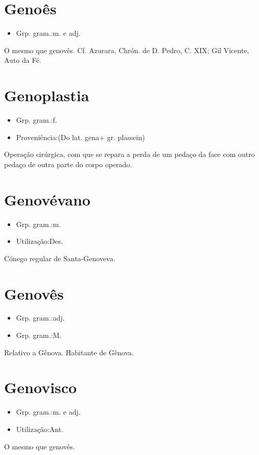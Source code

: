 \section{Genoês}
\begin{itemize}
\item {Grp. gram.:m.  e  adj.}
\end{itemize}
O mesmo que \textunderscore genovês\textunderscore . Cf. Azurara, \textunderscore Chrón. de D. Pedro\textunderscore , C. XIX; Gil Vicente, \textunderscore Auto da Fé\textunderscore .
\section{Genoplastia}
\begin{itemize}
\item {Grp. gram.:f.}
\end{itemize}
\begin{itemize}
\item {Proveniência:(Do lat. \textunderscore gena\textunderscore  + gr. \textunderscore plassein\textunderscore )}
\end{itemize}
Operação cirúrgica, com que se repara a perda de um pedaço da face com outro pedaço de outra parte do corpo operado.
\section{Genovévano}
\begin{itemize}
\item {Grp. gram.:m.}
\end{itemize}
\begin{itemize}
\item {Utilização:Des.}
\end{itemize}
Cónego regular de Santa-Genoveva.
\section{Genovês}
\begin{itemize}
\item {Grp. gram.:adj.}
\end{itemize}
\begin{itemize}
\item {Grp. gram.:M.}
\end{itemize}
Relativo a Gênova.
Habitante de Gênova.
\section{Genovisco}
\begin{itemize}
\item {Grp. gram.:m.  e  adj.}
\end{itemize}
\begin{itemize}
\item {Utilização:Ant.}
\end{itemize}
O mesmo que \textunderscore genovês\textunderscore .
